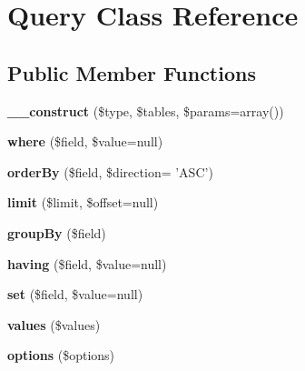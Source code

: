 \hypertarget{classQuery}{
\section{Query Class Reference}
\label{classQuery}
}
\subsection*{Public Member Functions}
\begin{DoxyCompactItemize}
\item 
\hypertarget{classQuery_a93e183b5c4cc9d5daf88db9a9cc77b73}{
{\bfseries \_\-\_\-construct} (\$type, \$tables, \$params=array())}
\label{classQuery_a93e183b5c4cc9d5daf88db9a9cc77b73}

\item 
\hypertarget{classQuery_a2a85569681386f9639d1831ccda85f09}{
{\bfseries where} (\$field, \$value=null)}
\label{classQuery_a2a85569681386f9639d1831ccda85f09}

\item 
\hypertarget{classQuery_a4fa583e36f9b6660a9583b7f98fcd044}{
{\bfseries orderBy} (\$field, \$direction= 'ASC')}
\label{classQuery_a4fa583e36f9b6660a9583b7f98fcd044}

\item 
\hypertarget{classQuery_a62fd1889b4b9962dc87caff7dd02b1a6}{
{\bfseries limit} (\$limit, \$offset=null)}
\label{classQuery_a62fd1889b4b9962dc87caff7dd02b1a6}

\item 
\hypertarget{classQuery_af38bb9919f8d8552057836235b232e7b}{
{\bfseries groupBy} (\$field)}
\label{classQuery_af38bb9919f8d8552057836235b232e7b}

\item 
\hypertarget{classQuery_a1a0556c274324e1c50048569d39551db}{
{\bfseries having} (\$field, \$value=null)}
\label{classQuery_a1a0556c274324e1c50048569d39551db}

\item 
\hypertarget{classQuery_ab6716433da04c804f8fb9a3fadea696e}{
{\bfseries set} (\$field, \$value=null)}
\label{classQuery_ab6716433da04c804f8fb9a3fadea696e}

\item 
\hypertarget{classQuery_a01db7a85252e9933d399b65731d3c93e}{
{\bfseries values} (\$values)}
\label{classQuery_a01db7a85252e9933d399b65731d3c93e}

\item 
\hypertarget{classQuery_a4a71954f527b10f556ae53bc544ece13}{
{\bfseries options} (\$options)}
\label{classQuery_a4a71954f527b10f556ae53bc544ece13}


\end{DoxyCompactItemize}
